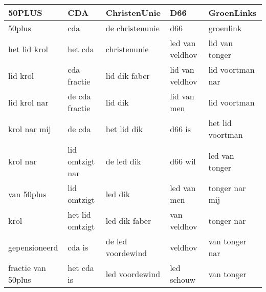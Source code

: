\begin{tabular}{lllll}
\toprule
             50PLUS &              CDA &       ChristenUnie &              D66 &        GroenLinks \\
\midrule
             50plus &              cda &    de christenunie &              d66 &         groenlink \\
       het lid krol &          het cda &       christenunie &  led van veldhov &    lid van tonger \\
           lid krol &      cda fractie &      lid dik faber &  lid van veldhov &  lid voortman nar \\
       lid krol nar &   de cda fractie &            lid dik &      lid van men &      lid voortman \\
       krol nar mij &           de cda &        het lid dik &           d66 is &  het lid voortman \\
           krol nar &  lid omtzigt nar &         de led dik &          d66 wil &    led van tonger \\
         van 50plus &      lid omtzigt &            led dik &      led van men &    tonger nar mij \\
               krol &  het lid omtzigt &      led dik faber &      van veldhov &        tonger nar \\
      gepensioneerd &           cda is &  de led voordewind &          veldhov &    van tonger nar \\
 fractie van 50plus &       het cda is &     led voordewind &       led schouw &        van tonger \\
\bottomrule
\end{tabular}
